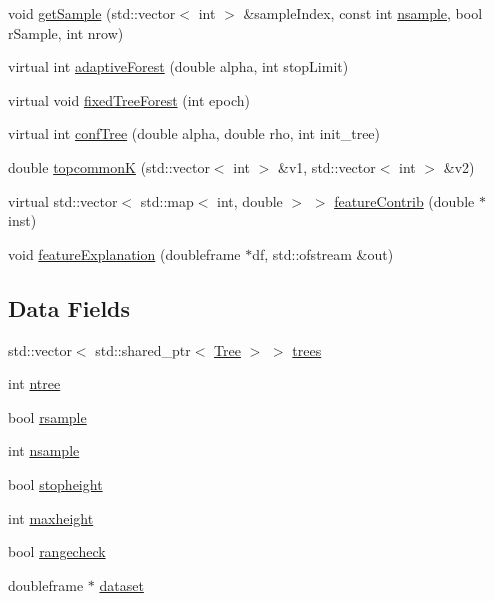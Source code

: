 \begin{DoxyCompactItemize}
void \hyperlink{classForest_aaa05ed85d49d7b465e518e62f1393210}{get\+Sample} (std\+::vector$<$ int $>$ \&sample\+Index, const int \hyperlink{classForest_a3a9831dba286e35fbe1f46ad9d363bf4}{nsample}, bool r\+Sample, int nrow)
\item 
virtual int \hyperlink{classForest_a825bb350730c50aa8924e9f761c4a2a4}{adaptive\+Forest} (double alpha, int stop\+Limit)
\item 
virtual void \hyperlink{classForest_a0699073aa8d6b46fdbdc36b7299a1a34}{fixed\+Tree\+Forest} (int epoch)
\item 
virtual int \hyperlink{classForest_aa2b99dda19e39783a6da9de8fa318ceb}{conf\+Tree} (double alpha, double rho, int init\+\_\+tree)
\item 
double \hyperlink{classForest_a43ce9dc43658d70521aa2aee91b9a60a}{topcommonK} (std\+::vector$<$ int $>$ \&v1, std\+::vector$<$ int $>$ \&v2)
\item 
virtual std\+::vector$<$ std\+::map$<$ int, double $>$ $>$ \hyperlink{classForest_a1c17fba4c766d0dbd41df7a050b1fa81}{feature\+Contrib} (double $\ast$inst)
\item 
void \hyperlink{classForest_abcae06f2a9b350eac3f8617ac7bc9e1a}{feature\+Explanation} (doubleframe $\ast$df, std\+::ofstream \&out)
\end{DoxyCompactItemize}
\subsection*{Data Fields}
\begin{DoxyCompactItemize}
\item 
std\+::vector$<$ std\+::shared\+\_\+ptr$<$ \hyperlink{classTree}{Tree} $>$ $>$ \hyperlink{classForest_acbfc6b953ce79295ecc9646fdb52e917}{trees}
\item 
int \hyperlink{classForest_a63aab05561b82d08972ee8fe455c45cc}{ntree}
\item 
bool \hyperlink{classForest_a64b54558dfe88223f0521443c0b34b17}{rsample}
\item 
int \hyperlink{classForest_a3a9831dba286e35fbe1f46ad9d363bf4}{nsample}
\item 
bool \hyperlink{classForest_a066998b292bc6c764b7244830f027631}{stopheight}
\item 
int \hyperlink{classForest_a296ffbe5ca7db543740dda34c71771f5}{maxheight}
\item 
bool \hyperlink{classForest_a590efbd7b01fa3fdb023d10df3d9792b}{rangecheck}
\item 
doubleframe $\ast$ \hyperlink{classForest_ac3704ed2300734a73cba5b04a8f4b6ae}{dataset}
\end{DoxyCompactItemize}


